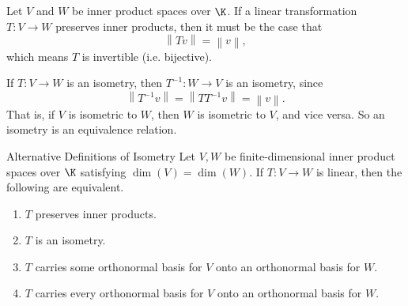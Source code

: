 \documentclass[linearalgebra]{subfiles}
\begin{document}
    \begin{remark}
        Let $V$ and $W$ be inner product spaces over $\K$. If a linear transformation $T:V\to W$ preserves inner products, then it must be the case that
        \begin{equation*}
            \left\lVert Tv\right\rVert = \left\lVert v\right\rVert ,
        \end{equation*}
        which means $T$ is invertible (i.e. bijective).
    \end{remark}

    \begin{remark}
        If $T:V\to W$ is an isometry, then $T^{-1}:W\to V$ is an isometry, since
        \begin{equation*}
            \left\lVert T^{-1}v\right\rVert = \left\lVert TT^{-1}v\right\rVert = \left\lVert v\right\rVert.
        \end{equation*}
        That is, if $V$ is isometric to $W$, then $W$ is isometric to $V$, and vice versa. So an isometry is an equivalence relation.
    \end{remark}

    \begin{prop}{Alternative Definitions of Isometry}
        Let $V,W$ be finite-dimensional inner product spaces over $\K$ satisfying $\dim(V)=\dim(W)$. If $T:V\to W$ is linear, then the following are equivalent.
        \begin{enumerate}
            \item $T$ preserves inner products.
            \item $T$ is an isometry.
            \item $T$ carries some orthonormal basis for $V$ onto an orthonormal basis for $W$.
            \item $T$ carries every orthonormal basis for $V$ onto an orthonormal basis for $W$.
        \end{enumerate}
    \end{prop}
\end{document}
